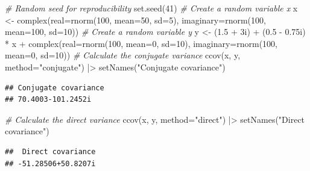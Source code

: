 \documentclass[
]{book}
\newenvironment{Shaded}{\begin{snugshade}}{\end{snugshade}}
\newcommand{\AttributeTok}[1]{\textcolor[rgb]{0.77,0.63,0.00}{#1}}
\newcommand{\CommentTok}[1]{\textcolor[rgb]{0.56,0.35,0.01}{\textit{#1}}}
\newcommand{\DecValTok}[1]{\textcolor[rgb]{0.00,0.00,0.81}{#1}}
\newcommand{\FloatTok}[1]{\textcolor[rgb]{0.00,0.00,0.81}{#1}}
\newcommand{\FunctionTok}[1]{\textcolor[rgb]{0.00,0.00,0.00}{#1}}
\newcommand{\NormalTok}[1]{#1}
\newcommand{\OtherTok}[1]{\textcolor[rgb]{0.56,0.35,0.01}{#1}}
\newcommand{\SpecialCharTok}[1]{\textcolor[rgb]{0.00,0.00,0.00}{#1}}
\newcommand{\StringTok}[1]{\textcolor[rgb]{0.31,0.60,0.02}{#1}}
\begin{document}
\begin{Shaded}
\begin{Highlighting}[]
\CommentTok{\# Random seed for reproducibility}
\FunctionTok{set.seed}\NormalTok{(}\DecValTok{41}\NormalTok{)}
\CommentTok{\# Create a random variable x}
\NormalTok{x }\OtherTok{\textless{}{-}} \FunctionTok{complex}\NormalTok{(}\AttributeTok{real=}\FunctionTok{rnorm}\NormalTok{(}\DecValTok{100}\NormalTok{, }\AttributeTok{mean=}\DecValTok{50}\NormalTok{, }\AttributeTok{sd=}\DecValTok{5}\NormalTok{),}
             \AttributeTok{imaginary=}\FunctionTok{rnorm}\NormalTok{(}\DecValTok{100}\NormalTok{, }\AttributeTok{mean=}\DecValTok{100}\NormalTok{, }\AttributeTok{sd=}\DecValTok{10}\NormalTok{))}
\CommentTok{\# Create a random variable y}
\NormalTok{y }\OtherTok{\textless{}{-}}\NormalTok{ (}\FloatTok{1.5} \SpecialCharTok{+}\NormalTok{ 3i) }\SpecialCharTok{+}\NormalTok{ (}\FloatTok{0.5} \SpecialCharTok{{-}} \FloatTok{0.75}\NormalTok{i) }\SpecialCharTok{*}\NormalTok{ x }\SpecialCharTok{+}
            \FunctionTok{complex}\NormalTok{(}\AttributeTok{real=}\FunctionTok{rnorm}\NormalTok{(}\DecValTok{100}\NormalTok{, }\AttributeTok{mean=}\DecValTok{0}\NormalTok{, }\AttributeTok{sd=}\DecValTok{10}\NormalTok{),}
                    \AttributeTok{imaginary=}\FunctionTok{rnorm}\NormalTok{(}\DecValTok{100}\NormalTok{, }\AttributeTok{mean=}\DecValTok{0}\NormalTok{, }\AttributeTok{sd=}\DecValTok{10}\NormalTok{))}
\CommentTok{\# Calculate the conjugate variance}
\FunctionTok{ccov}\NormalTok{(x, y, }\AttributeTok{method=}\StringTok{"conjugate"}\NormalTok{) }\SpecialCharTok{|\textgreater{}}
    \FunctionTok{setNames}\NormalTok{(}\StringTok{"Conjugate covariance"}\NormalTok{)}
\end{Highlighting}
\end{Shaded}

\begin{verbatim}
## Conjugate covariance 
## 70.4003-101.2452i
\end{verbatim}

\begin{Shaded}
\begin{Highlighting}[]
\CommentTok{\# Calculate the direct variance}
\FunctionTok{ccov}\NormalTok{(x, y, }\AttributeTok{method=}\StringTok{"direct"}\NormalTok{) }\SpecialCharTok{|\textgreater{}}
    \FunctionTok{setNames}\NormalTok{(}\StringTok{"Direct covariance"}\NormalTok{)}
\end{Highlighting}
\end{Shaded}

\begin{verbatim}
##  Direct covariance 
## -51.28506+50.8207i
\end{verbatim}
\end{document}
